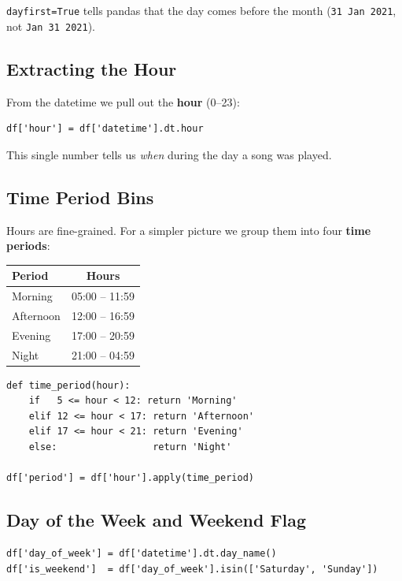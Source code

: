 \documentclass[12pt, a4paper]{article}
\begin{document}
\texttt{dayfirst=True} tells pandas that the day comes before the month
(\texttt{31 Jan 2021}, not \texttt{Jan 31 2021}).

\subsection{Extracting the Hour}
From the datetime we pull out the \textbf{hour} (0--23):

\begin{lstlisting}
df['hour'] = df['datetime'].dt.hour
\end{lstlisting}

This single number tells us \emph{when} during the day a song was played.

\subsection{Time Period Bins}
Hours are fine-grained. For a simpler picture we group them into four
\textbf{time periods}:

\begin{center}
\begin{tabular}{lc}
    \toprule
    \textbf{Period} & \textbf{Hours} \\
    \midrule
    Morning   & 05:00 -- 11:59 \\
    Afternoon & 12:00 -- 16:59 \\
    Evening   & 17:00 -- 20:59 \\
    Night     & 21:00 -- 04:59 \\
    \bottomrule
\end{tabular}
\end{center}

\begin{lstlisting}
def time_period(hour):
    if   5 <= hour < 12: return 'Morning'
    elif 12 <= hour < 17: return 'Afternoon'
    elif 17 <= hour < 21: return 'Evening'
    else:                 return 'Night'

df['period'] = df['hour'].apply(time_period)
\end{lstlisting}

\subsection{Day of the Week and Weekend Flag}
\begin{lstlisting}
df['day_of_week'] = df['datetime'].dt.day_name()
df['is_weekend']  = df['day_of_week'].isin(['Saturday', 'Sunday'])
\end{lstlisting}
\end{document}
